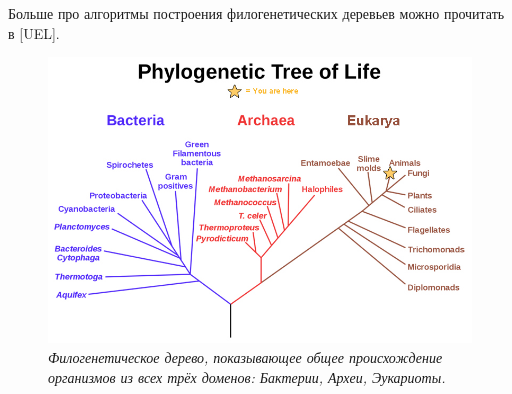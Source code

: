\documentclass[11pt,a4paper]{report}
\theoremstyle{definition}
\theoremstyle{definition}
\theoremstyle{definition}
\begin{document}
	\noindent Больше про алгоритмы построения филогенетических деревьев можно прочитать в [UEL].
	\begin{figure}[!hbtp]
		\includegraphics[width=\textwidth]{./img/phylogenetic_tree.jpg}
		\caption{\textit{Филогенетическое дерево, показывающее общее происхождение организмов из всех трёх доменов: Бактерии, Археи, Эукариоты.}}
	\end{figure}
	\clearpage
\end{document}
